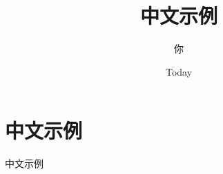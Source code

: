 \documentclass{ctexart}
\title{中文示例}
\author{你}
\date{Today}
\begin{document}
\maketitle

\section{中文示例}
中文示例
\end{document}
